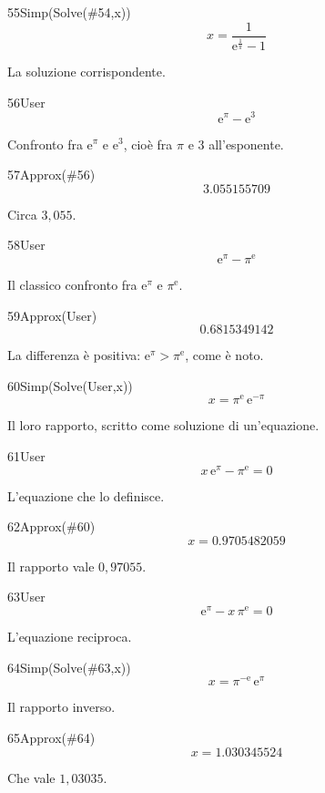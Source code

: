 \begin{espr}{55}{Simp(Solve(\#54,x))}{}
\[
x = \frac{1}{\mathrm{e}^{\frac{1}{\pi}} - 1}
\]
\end{espr}
La soluzione corrispondente.

\begin{espr}{56}{User}{}
\[
\mathrm{e}^{\pi} - \mathrm{e}^{3}
\]
\end{espr}
Confronto fra $\mathrm{e}^{\pi}$ e $\mathrm{e}^3$, cioè fra $\pi$ e $3$ all'esponente.

\begin{espr}{57}{Approx(\#56)}{}
\[
3.055155709
\]
\end{espr}
Circa $3{,}055$.

\begin{espr}{58}{User}{}
\[
\mathrm{e}^{\pi} - \pi^{\mathrm{e}}
\]
\end{espr}
Il classico confronto fra $\mathrm{e}^{\pi}$ e $\pi^{\mathrm{e}}$.

\begin{espr}{59}{Approx(User)}{}
\[
0.6815349142
\]
\end{espr}
La differenza è positiva: $\mathrm{e}^{\pi}>\pi^{\mathrm{e}}$, come è noto.

\begin{espr}{60}{Simp(Solve(User,x))}{}
\[
x = \pi^{\mathrm{e}}\, \mathrm{e}^{-\pi}
\]
\end{espr}
Il loro rapporto, scritto come soluzione di un'equazione.

\begin{espr}{61}{User}{}
\[
x\, \mathrm{e}^{\pi} - \pi^{\mathrm{e}} = 0
\]
\end{espr}
L'equazione che lo definisce.

\begin{espr}{62}{Approx(\#60)}{}
\[
x = 0.9705482059
\]
\end{espr}
Il rapporto vale $0{,}97055$.

\begin{espr}{63}{User}{}
\[
\mathrm{e}^{\pi} - x\, \pi^{\mathrm{e}} = 0
\]
\end{espr}
L'equazione reciproca.

\begin{espr}{64}{Simp(Solve(\#63,x))}{}
\[
x = \pi^{-\mathrm{e}}\, \mathrm{e}^{\pi}
\]
\end{espr}
Il rapporto inverso.

\begin{espr}{65}{Approx(\#64)}{}
\[
x = 1.030345524
\]
\end{espr}
Che vale $1{,}03035$.

